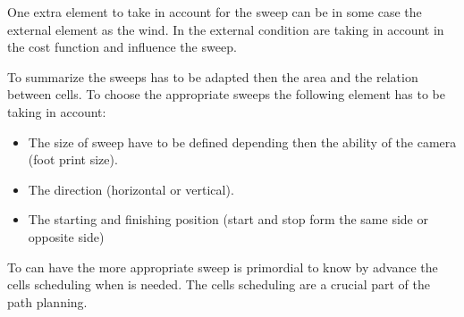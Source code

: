 	One extra element to take in account for the sweep can be in some case the external element as the wind. In \citep{215*lee2010,190*hsu2014}  %
	the external condition are taking in account in the cost function and influence the sweep.
	
	
	To summarize the sweeps has to be adapted then the area and the relation between cells. To choose the appropriate sweeps the following element has to be taking in account:
	\begin{itemize}
		\item The size of sweep  have to be defined depending then the ability of the camera (foot print size).
		\item The direction (horizontal or vertical).
		\item The  starting and finishing  position (start and stop form the same side or opposite side)
	\end{itemize}
To  can have the more appropriate sweep is primordial to know by advance  the cells scheduling when is needed. The cells scheduling are a crucial part of the path planning.

	
	 

	 
	
